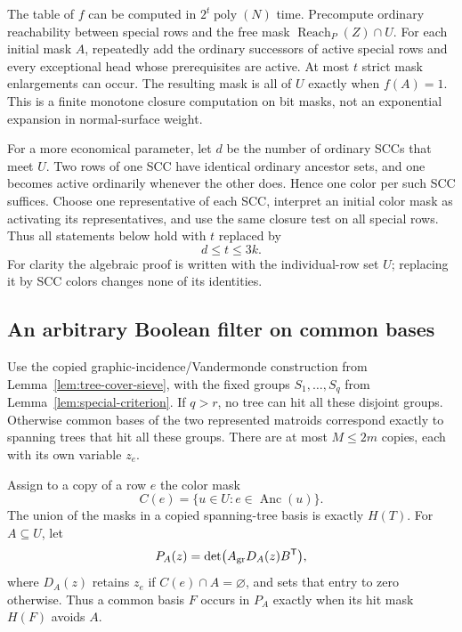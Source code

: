 The table of $f$ can be computed in $2^t\operatorname{poly}(N)$ time.
Precompute ordinary reachability between special rows and the free mask
$\operatorname{Reach}_P(Z)\cap U$.  For each initial mask $A$, repeatedly
add the ordinary successors of active special rows and every exceptional
head whose prerequisites are active.  At most $t$ strict mask enlargements
can occur.  The resulting mask is all of $U$ exactly when $f(A)=1$.
This is a finite monotone closure computation on bit masks, not an
exponential expansion in normal-surface weight.

For a more economical parameter, let $d$ be the number of ordinary SCCs
that meet $U$.  Two rows of one SCC have identical ordinary ancestor sets,
and one becomes active ordinarily whenever the other does.  Hence one
color per such SCC suffices.  Choose one representative of each SCC,
interpret an initial color mask as activating its representatives, and
use the same closure test on all special rows.  Thus all statements below
hold with $t$ replaced by
\begin{equation}\label{eq:activation-dimension}
             d\leq t\leq3k.
\end{equation}
For clarity the algebraic proof is written with the individual-row set
$U$; replacing it by SCC colors changes none of its identities.

\subsection{An arbitrary Boolean filter on common bases}

Use the copied graphic-incidence/Vandermonde construction from
Lemma~\ref{lem:tree-cover-sieve}, with the fixed groups $S_1,\ldots,S_q$
from Lemma~\ref{lem:special-criterion}.  If $q>r$, no tree can hit all
these disjoint groups.  Otherwise common bases of the two represented
matroids correspond exactly to spanning trees that hit all these groups.
There are at most $M\leq2m$ copies, each with its own variable $z_e$.

Assign to a copy of a row $e$ the color mask
\[
             C(e)=\{u\in U:e\in\operatorname{Anc}(u)\}.
\]
The union of the masks in a copied spanning-tree basis is exactly $H(T)$.
For $A\subseteq U$, let
\[
     P_A(z)=\det\bigl(A_{\rm gr} D_A(z)B^{\mathsf T}\bigr),
\]
where $D_A(z)$ retains $z_e$ if $C(e)\cap A=\varnothing$, and sets that
entry to zero otherwise.  Thus a common basis $F$ occurs in $P_A$ exactly
when its hit mask $H(F)$ avoids $A$.

